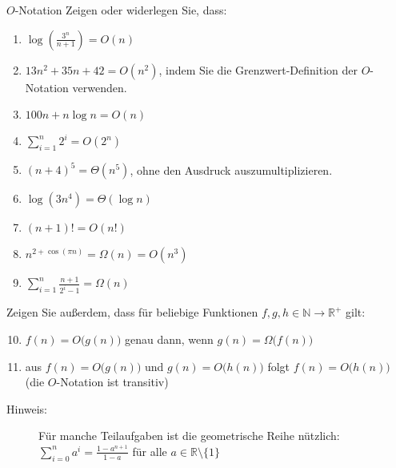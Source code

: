 \documentclass[11pt,a4paper]{article}
\begin{document}
\thispagestyle{empty}



\begin{aufgabe}{1}{$O$-Notation}
Zeigen oder widerlegen Sie, dass:
\begin{enumerate}
    \item $\operatorname{log}\left(\frac{3^n}{n + 1}\right) = O(n)$
    \item $13n^2 + 35n + 42 = O(n^2)$, indem Sie die Grenzwert-Definition der $O$-Notation verwenden.
    \item $100n + n \log n = O(n)$
    \item $\sum\limits_{i=1}^{n} 2^i = O(2^n)$
    \item $(n + 4)^5 = \Theta(n^5)$, ohne den Ausdruck auszumultiplizieren.
    \item $\log(3n^4) = \Theta(\log n)$
    \item $(n + 1)! = O(n!)$
    \item $n^{2 + \cos(\pi n)} = \Omega(n) = O(n^3)$
    \item $\sum\limits_{i=1}^{n} \frac{n + 1}{2^i - 1} = \Omega(n)$
\end{enumerate}
Zeigen Sie außerdem, dass für beliebige Funktionen $f, g, h \in \mathbb{N} \rightarrow \mathbb{R}^{+}$ gilt:
\begin{enumerate}
    \setcounter{enumi}{9}
    \item $f(n) = O\big(g(n)\big)$ genau dann, wenn $g(n) = \Omega\big(f(n)\big)$
    \item aus $f(n) = O\big(g(n)\big)$ und $g(n) = O\big(h(n)\big)$ folgt $f(n) = O\big(h(n)\big)$ (die $O$-Notation ist transitiv)
\end{enumerate}
\begin{description}
    \item[Hinweis:] Für manche Teilaufgaben ist die geometrische Reihe nützlich: $\sum\limits_{i=0}^n a^i = \frac{1 - a^{n+1}}{1 - a}$ für alle $a \in \mathbb{R} \setminus \{1\}$
\end{description}
\end{aufgabe}
\end{document}
